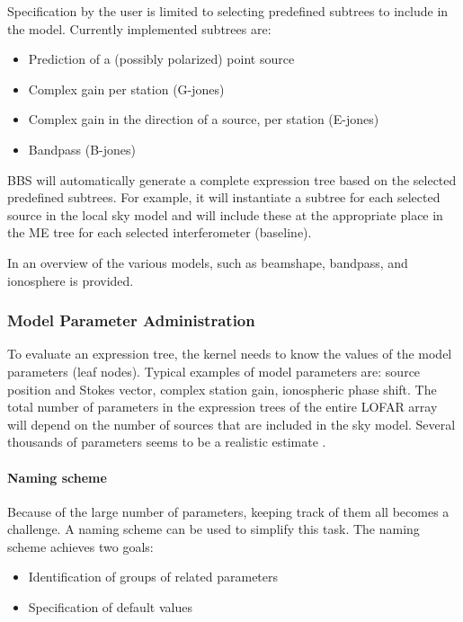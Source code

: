 \documentclass[10pt]{lofar}
\begin{document}
Specification by the user is limited to selecting predefined subtrees to include
in the model. Currently implemented subtrees are:
\begin{itemize}
\item Prediction of a (possibly polarized) point source
\item Complex gain per station (G-jones)
\item Complex gain in the direction of a source, per station (E-jones)
\item Bandpass (B-jones)
\end{itemize}

BBS will automatically generate a complete expression tree based on the
selected predefined subtrees. For example, it will instantiate a subtree for
each selected source in the local sky model and will include these at the
appropriate place in the ME tree for each selected interferometer (baseline).

In \cite[sec. 2]{LOFAR-ASTRON-SDD-050}\cite{LOFAR-ASTRON-ADD-015} an overview of
the various models, such as beamshape, bandpass, and ionosphere is provided. 

\subsubsection{Model Parameter Administration}
\label{subsubsec:admin-model-parms}

To evaluate an expression tree, the kernel needs to know the values of the model
parameters (leaf nodes). Typical examples of model parameters are: source
position and Stokes vector, complex station gain, ionospheric phase shift. The
total number of parameters in the expression trees of the entire LOFAR array
will depend on the number of sources that are included in the sky model. Several
thousands of parameters seems to be a realistic estimate
\cite{LOFAR-ASTRON-ADD-015}.

\paragraph{Naming scheme}
Because of the large number of parameters, keeping track of them all becomes a
challenge. A naming scheme can be used to simplify this task. The naming scheme
achieves two goals:
\begin{itemize}
\item Identification of groups of related parameters
\item Specification of default values
\end{itemize}
\end{document}
